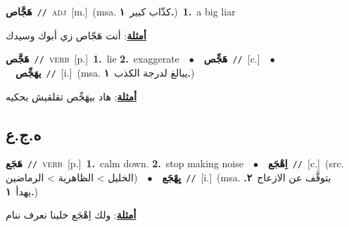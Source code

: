 \documentclass[10pt,a4paper,twoside]{article} %
\begin{document}
\begin{multicols}{2}
{\setlength\topsep{0pt}\textbf{\foreignlanguage{arabic}{هَجَّاص}}\ {\color{gray}\texttt{//}\color{black}}\ \textsc{adj}\ [m.]\ \color{gray}(msa. \foreignlanguage{arabic}{كذّاب كبير}~\foreignlanguage{arabic}{\textbf{١.}})\color{black}\ \textbf{1.}~a big liar\  \begin{flushright}\color{gray}\foreignlanguage{arabic}{\textbf{\underline{\foreignlanguage{arabic}{أمثلة}}}: أنت هَجّاص زي أبوك وسيدك}\end{flushright}\color{black}} \vspace{2mm}

{\setlength\topsep{0pt}\textbf{\foreignlanguage{arabic}{هَجَّص}}\ {\color{gray}\texttt{//}\color{black}}\ \textsc{verb}\ [p.]\ \textbf{1.}~lie  \textbf{2.}~exaggerate\ \ $\bullet$\ \ \setlength\topsep{0pt}\textbf{\foreignlanguage{arabic}{هَجِّص}}\ {\color{gray}\texttt{//}\color{black}}\ [c.]\ \ $\bullet$\ \ \setlength\topsep{0pt}\textbf{\foreignlanguage{arabic}{يهَجِّص}}\ {\color{gray}\texttt{//}\color{black}}\ [i.]\ \color{gray}(msa. \foreignlanguage{arabic}{يبالغ لدرجة الكذب}~\foreignlanguage{arabic}{\textbf{١.}})\color{black}\  \begin{flushright}\color{gray}\foreignlanguage{arabic}{\textbf{\underline{\foreignlanguage{arabic}{أمثلة}}}: هاد بيهَجِّص تقلقيش بحكيه}\end{flushright}\color{black}} \vspace{2mm}

\vspace{-3mm}
\subsection*{\color{blue}\foreignlanguage{arabic}{ه.ج.ع}\color{blue}{}} 

{\setlength\topsep{0pt}\textbf{\foreignlanguage{arabic}{هَجَع}}\ {\color{gray}\texttt{//}\color{black}}\ \textsc{verb}\ [p.]\ \textbf{1.}~calm down.  \textbf{2.}~stop making noise\ \ $\bullet$\ \ \setlength\topsep{0pt}\textbf{\foreignlanguage{arabic}{اِهْجَع}}\ {\color{gray}\texttt{//}\color{black}}\ [c.]\ (src. \color{gray}\foreignlanguage{arabic}{الخليل > الظاهرية > الرماضين}\color{black})\ \ $\bullet$\ \ \setlength\topsep{0pt}\textbf{\foreignlanguage{arabic}{يِهْجَع}}\ {\color{gray}\texttt{//}\color{black}}\ [i.]\ \color{gray}(msa. \foreignlanguage{arabic}{يتوقَّف عن الازعاج}~\foreignlanguage{arabic}{\textbf{٢.}}  \foreignlanguage{arabic}{يهدأ}~\foreignlanguage{arabic}{\textbf{١.}})\color{black}\  \begin{flushright}\color{gray}\foreignlanguage{arabic}{\textbf{\underline{\foreignlanguage{arabic}{أمثلة}}}: ولك اِهْجَع خلينا نعرف ننام}\end{flushright}\color{black}} \vspace{2mm}


\end{multicols}
\end{document}
